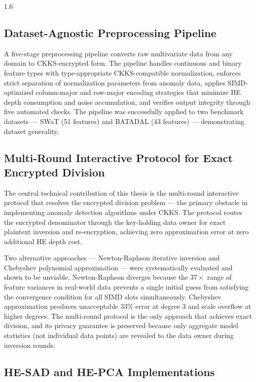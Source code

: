 \begin{spacing}{1.6}
\subsection{Dataset-Agnostic Preprocessing Pipeline}

A five-stage preprocessing pipeline converts raw multivariate data from any
domain to CKKS-encrypted form. The pipeline handles continuous and binary
feature types with type-appropriate CKKS-compatible normalization, enforces
strict separation of normalization parameters from anomaly data, applies
SIMD-optimized column-major and row-major encoding strategies that minimize
HE depth consumption and noise accumulation, and verifies output integrity
through five automated checks. The pipeline was successfully applied to two
benchmark datasets --- SWaT (51 features) and BATADAL (43 features) ---
demonstrating dataset generality.

\subsection{Multi-Round Interactive Protocol for Exact Encrypted Division}

The central technical contribution of this thesis is the multi-round interactive
protocol that resolves the encrypted division problem --- the primary obstacle
in implementing anomaly detection algorithms under CKKS. The protocol routes
the encrypted denominator through the key-holding data owner for exact plaintext
inversion and re-encryption, achieving zero approximation error at zero
additional HE depth cost.

Two alternative approaches --- Newton-Raphson iterative inversion and Chebyshev
polynomial approximation --- were systematically evaluated and shown to be
unviable. Newton-Raphson diverges because the $37\times$ range of feature
variances in real-world data prevents a single initial guess from satisfying
the convergence condition for all SIMD slots simultaneously. Chebyshev
approximation produces unacceptable 33\% error at degree 3 and scale overflow
at higher degrees. The multi-round protocol is the only approach that achieves
exact division, and its privacy guarantee is preserved because only aggregate
model statistics (not individual data points) are revealed to the data owner
during inversion rounds.

\subsection{HE-SAD and HE-PCA Implementations}


\end{spacing}
